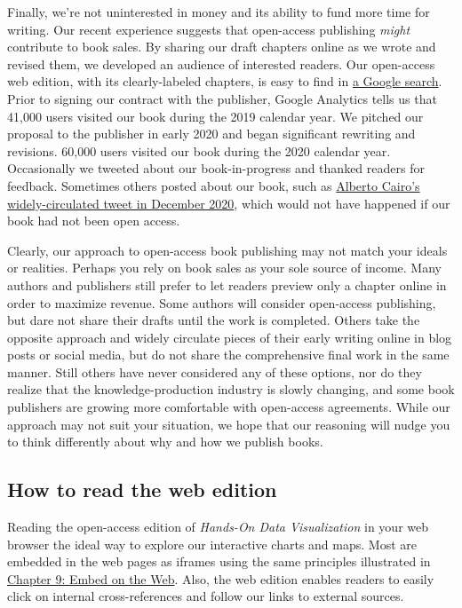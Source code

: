 \documentclass[
  english,
]{book}
\begin{document}
Finally, we're not uninterested in money and its ability to fund more time for writing. Our recent experience suggests that open-access publishing \emph{might} contribute to book sales. By sharing our draft chapters online as we wrote and revised them, we developed an audience of interested readers. Our open-access web edition, with its clearly-labeled chapters, is easy to find in \href{https://www.google.com/search?hl=en\&as_q=hands+on+data+visualization}{a Google search}. Prior to signing our contract with the publisher, Google Analytics tells us that 41,000 users visited our book during the 2019 calendar year. We pitched our proposal to the publisher in early 2020 and began significant rewriting and revisions. 60,000 users visited our book during the 2020 calendar year. Occasionally we tweeted about our book-in-progress and thanked readers for feedback. Sometimes others posted about our book, such as \href{https://twitter.com/AlbertoCairo/status/1338134036758335495}{Alberto Cairo's widely-circulated tweet in December 2020}, which would not have happened if our book had not been open access.

Clearly, our approach to open-access book publishing may not match your ideals or realities. Perhaps you rely on book sales as your sole source of income. Many authors and publishers still prefer to let readers preview only a chapter online in order to maximize revenue. Some authors will consider open-access publishing, but dare not share their drafts until the work is completed. Others take the opposite approach and widely circulate pieces of their early writing online in blog posts or social media, but do not share the comprehensive final work in the same manner. Still others have never considered any of these options, nor do they realize that the knowledge-production industry is slowly changing, and some book publishers are growing more comfortable with open-access agreements. While our approach may not suit your situation, we hope that our reasoning will nudge you to think differently about why and how we publish books.

\hypertarget{how-to-read-the-web-edition}{%
\subsection*{How to read the web edition}\label{how-to-read-the-web-edition}}

Reading the open-access edition of \emph{Hands-On Data Visualization} in your web browser the ideal way to explore our interactive charts and maps. Most are embedded in the web pages as iframes using the same principles illustrated in \href{embed.html}{Chapter 9: Embed on the Web}. Also, the web edition enables readers to easily click on internal cross-references and follow our links to external sources.
\end{document}
